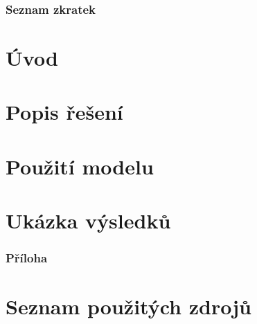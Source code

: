 \documentclass[a4paper, 11pt, twoside]{article}
\begin{document}
  \thispagestyle{empty}
  



  \newpage
  \setcounter{page}{1} %
  \tableofcontents{}


  \newpage
  \section*{Seznam zkratek}
  \begin{multicols}{2}
  
  \end{multicols}



  \newpage
  \setcounter{page}{1}%
  \part*{Úvod}

  

  \newpage
  \part{Popis řešení}\label{cast:1}
  




  \newpage
  \part{Použití modelu}\label{cast:2}
  

  \newpage
  \part{Ukázka výsledků}
%   

  \newpage
  \appendix
  \section*{Příloha}\label{sec:priloha}
  




  \newpage

  \part*{Seznam použitých zdrojů}
  
  
\end{document}
